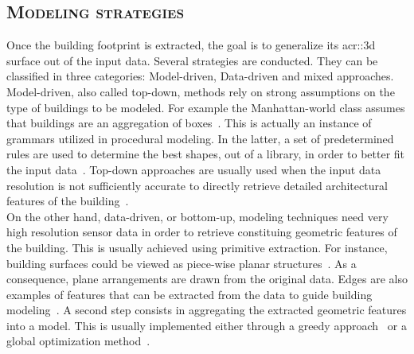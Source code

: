     \subsection{\textsc{Modeling strategies}}
        \label{subsec::state_of_the_art::building_modeling::modeling_strategies}
        Once the building footprint is extracted, the goal is to generalize its \gls{acr::3d} surface out of the input data.
        Several strategies are conducted.
        They can be classified in three categories: Model-driven, Data-driven and mixed approaches.\\

        Model-driven, also called top-down, methods rely on strong assumptions on the type of buildings to be modeled.
        For example the Manhattan-world class assumes that buildings are an aggregation of boxes~\parencite{vanegas2010building,ledoux2011topologically,arroyo2015dimension,li2016manhattan}.
        This is actually an instance of grammars utilized in procedural modeling.
        In the latter, a set of predetermined rules are used to determine the best shapes, out of a library, in order to better fit the input data~\parencite{lafarge2008structural,koutsourakis2009single,zhou20102,mathias2011procedural,martinovic2013bayesian,nan2015template,demir2015procedural,zeng2018neural}.
        Top-down approaches are usually used when the input data resolution is not sufficiently accurate to directly retrieve detailed architectural features of the building~\parencite{lafarge2008structural}.\\

        On the other hand, data-driven, or bottom-up, modeling techniques need very high resolution sensor data in order to retrieve constituing geometric features of the building.
        This is usually achieved using primitive extraction.
        For instance, building surfaces could be viewed as piece-wise planar structures~\parencite{taillandier2004automatic,lafarge2012creating,nan2017polyfit}.
        As a consequence, plane arrangements are drawn from the original data.
        Edges are also examples of features that can be extracted from the data to guide building modeling~\parencite{baillard1999automatic}.
        A second step consists in aggregating the extracted geometric features into a model.
        This is usually implemented either through a greedy approach~\parencite{taillandier2004automatic} or a global optimization method~\parencite{poullis2013framework,verdie2015lod,zhu2018large,holzmann2018semantically}.\\

